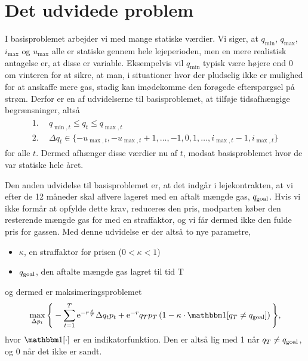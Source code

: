 \section{Det udvidede problem} \label{kap:udvidet_problem}

I basisproblemet arbejder vi med mange statiske værdier. Vi siger, at $q_{\min}$, $q_{\max}$, $i_{\max}$ og $u_{\max}$ alle er statiske gennem hele lejeperioden, men en mere realistisk antagelse er, at disse er variable. Eksempelvis vil $q_{\min}$ typisk være højere end 0 om vinteren for at sikre, at man, i situationer hvor der pludselig ikke er mulighed for at anskaffe mere gas, stadig kan imødekomme den forøgede efterspørgsel på strøm. Derfor er en af udvidelserne til basisproblemet, at tilføje tidsafhængige begrænsninger, altså
\begin{align}
\begin{split}
\textrm{1.}& \ \ q_{\min,t} \leq q_{t} \leq q_{\max,t} \\
\textrm{2.}& \ \ \Delta q_{t} \in \{-u_{\max,t}, -u_{\max,t} + 1, \dotsc, -1, 0, 1, \dotsc, i_{\max,t} -1, i_{\max,t} \}
\end{split}
\end{align}
for alle $t$. Dermed afhænger disse værdier nu af $t$, modsat basisproblemet hvor de var statiske hele året. 

Den anden udvidelse til basisproblemet er, at det indgår i lejekontrakten, at vi efter de 12 måneder skal aflvere lageret med en aftalt mængde gas, $q_{\textrm{goal}}$. Hvis vi ikke formår at opfylde dette krav, reduceres den pris, modparten køber den resterende mængde gas for med en straffaktor, og vi får dermed ikke den fulde pris for gassen. Med denne udvidelse er der altså to nye parametre,
\begin{itemize}
\item $\kappa$, en straffaktor for prisen ($0 < \kappa < 1$)
\item $q_{\textrm{goal}}$, den aftalte mængde gas lagret til tid T
\end{itemize}
og dermed er maksimeringsproblemet
\begin{equation}
\max_{\Delta p_{t}} \Bigg\{ -\sum_{t=1}^{T} \mathrm{e}^{-r\frac{t}{T}} \Delta q_{t} p_{t}+ \mathrm{e}^{-r}q_{T}p_{T} \left (1- \kappa \cdot \ind [q_{T} \neq q_{\goal}] \right )  \Bigg\}, 
\end{equation}
hvor $\ind [\cdot]$ er en indikatorfunktion. Den er altså lig med 1 når $q_{T} \neq q_{\textrm{goal}}$, og 0 når det ikke er sandt. 